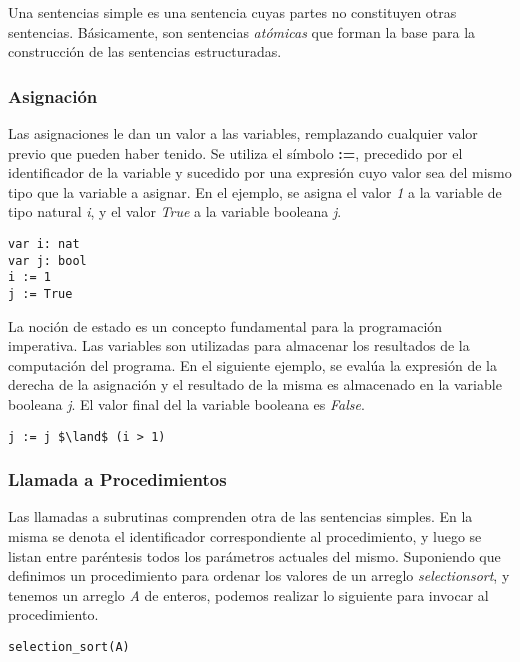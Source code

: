 \documentclass{article}
\begin{document}
Una sentencias simple es una sentencia cuyas partes no constituyen otras sentencias.
Básicamente, son sentencias \textit{atómicas} que forman la base para la construcción de las sentencias estructuradas.

\subsubsection{Asignación}

Las asignaciones le dan un valor a las variables, remplazando cualquier valor previo que pueden haber tenido.
Se utiliza el símbolo \textbf{:=}, precedido por el identificador de la variable y sucedido por una expresión cuyo valor sea del mismo tipo que la variable a asignar.
En el ejemplo, se asigna el valor \textit{1} a la variable de tipo natural \textit{i}, y el valor \textit{True} a la variable booleana \textit{j}.

\begin{lstlisting}
var i: nat
var j: bool
i := 1
j := True
\end{lstlisting}

La noción de estado es un concepto fundamental para la programación imperativa.
Las variables son utilizadas para almacenar los resultados de la computación del programa.
En el siguiente ejemplo, se evalúa la expresión de la derecha de la asignación y el resultado de la misma es almacenado en la variable booleana \textit{j}.
El valor final del la variable booleana es \textit{False}.

\begin{lstlisting}
j := j $\land$ (i > 1)
\end{lstlisting}

\subsubsection{Llamada a Procedimientos}

Las llamadas a subrutinas comprenden otra de las sentencias simples.
En la misma se denota el identificador correspondiente al procedimiento, y luego se listan entre paréntesis todos los parámetros actuales del mismo.
Suponiendo que definimos un procedimiento para ordenar los valores de un arreglo \textit{selection\gbajo sort}, y tenemos un arreglo \textit{A} de enteros, podemos realizar lo siguiente para invocar al procedimiento.

\begin{lstlisting}
selection_sort(A)
\end{lstlisting}
\end{document}
